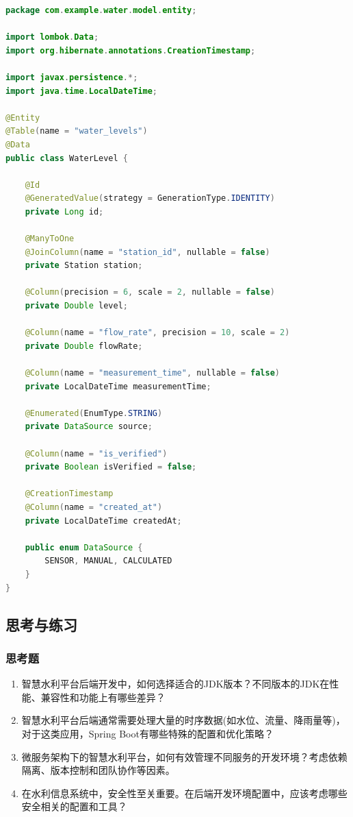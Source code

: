 \begin{lstlisting}[language=Java]
package com.example.water.model.entity;

import lombok.Data;
import org.hibernate.annotations.CreationTimestamp;

import javax.persistence.*;
import java.time.LocalDateTime;

@Entity
@Table(name = "water_levels")
@Data
public class WaterLevel {
    
    @Id
    @GeneratedValue(strategy = GenerationType.IDENTITY)
    private Long id;
    
    @ManyToOne
    @JoinColumn(name = "station_id", nullable = false)
    private Station station;
    
    @Column(precision = 6, scale = 2, nullable = false)
    private Double level;
    
    @Column(name = "flow_rate", precision = 10, scale = 2)
    private Double flowRate;
    
    @Column(name = "measurement_time", nullable = false)
    private LocalDateTime measurementTime;
    
    @Enumerated(EnumType.STRING)
    private DataSource source;
    
    @Column(name = "is_verified")
    private Boolean isVerified = false;
    
    @CreationTimestamp
    @Column(name = "created_at")
    private LocalDateTime createdAt;
    
    public enum DataSource {
        SENSOR, MANUAL, CALCULATED
    }
}
\end{lstlisting}

\subsection{思考与练习}\label{ux601dux8003ux4e0eux7ec3ux4e60}

\subsubsection{思考题}\label{ux601dux8003ux9898}

\begin{enumerate}
\def\labelenumi{\arabic{enumi}.}
\item
  智慧水利平台后端开发中，如何选择适合的JDK版本？不同版本的JDK在性能、兼容性和功能上有哪些差异？
\item
  智慧水利平台后端通常需要处理大量的时序数据(如水位、流量、降雨量等)，对于这类应用，Spring
  Boot有哪些特殊的配置和优化策略？
\item
  微服务架构下的智慧水利平台，如何有效管理不同服务的开发环境？考虑依赖隔离、版本控制和团队协作等因素。
\item
  在水利信息系统中，安全性至关重要。在后端开发环境配置中，应该考虑哪些安全相关的配置和工具？
\end{enumerate}

